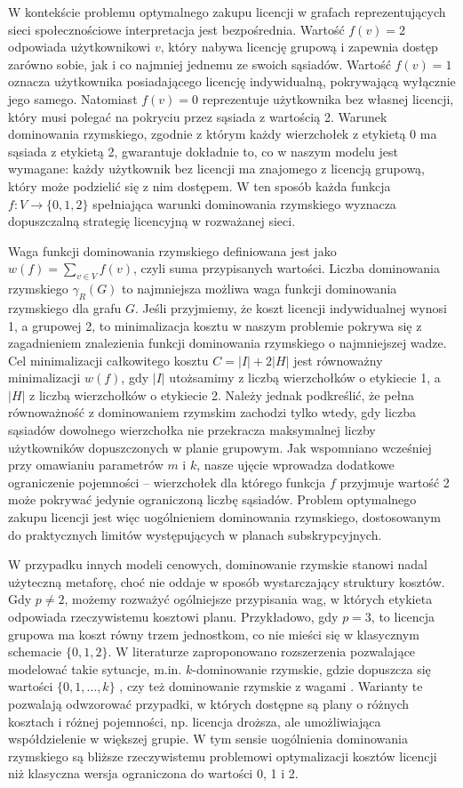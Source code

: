 W kontekście problemu optymalnego zakupu licencji w grafach reprezentujących sieci społecznościowe interpretacja jest bezpośrednia. Wartość $f(v)=2$ odpowiada użytkownikowi $v$, który nabywa licencję grupową i zapewnia dostęp zarówno sobie, jak i co najmniej jednemu ze swoich sąsiadów. Wartość $f(v)=1$ oznacza użytkownika posiadającego licencję indywidualną, pokrywającą wyłącznie jego samego. Natomiast $f(v)=0$ reprezentuje użytkownika bez własnej licencji, który musi polegać na pokryciu przez sąsiada z wartością 2. Warunek dominowania rzymskiego, zgodnie z którym każdy wierzchołek z etykietą 0 ma sąsiada z etykietą 2, gwarantuje dokładnie to, co w naszym modelu jest wymagane: każdy użytkownik bez licencji ma znajomego z licencją grupową, który może podzielić się z nim dostępem. W ten sposób każda funkcja $f:V \to \{0,1,2\}$ spełniająca warunki dominowania rzymskiego wyznacza dopuszczalną strategię licencyjną w rozważanej sieci.


Waga funkcji dominowania rzymskiego definiowana jest jako $w(f) = \sum_{v \in V} f(v)$, czyli suma przypisanych wartości. Liczba dominowania rzymskiego $\gamma_R(G)$ to najmniejsza możliwa waga funkcji dominowania rzymskiego dla grafu $G$. Jeśli przyjmiemy, że koszt licencji indywidualnej wynosi 1, a grupowej 2, to minimalizacja kosztu w naszym problemie pokrywa się z zagadnieniem znalezienia funkcji dominowania rzymskiego o najmniejszej wadze. Cel minimalizacji całkowitego kosztu $C = |I| + 2|H|$ jest równoważny minimalizacji $w(f)$, gdy $|I|$ utożsamimy z liczbą wierzchołków o etykiecie 1, a $|H|$ z liczbą wierzchołków o etykiecie 2. Należy jednak podkreślić, że pełna równoważność z dominowaniem rzymskim zachodzi tylko wtedy, gdy liczba sąsiadów dowolnego wierzchołka nie przekracza maksymalnej liczby użytkowników dopuszczonych w planie grupowym. Jak wspomniano wcześniej przy omawianiu parametrów $m$ i $k$, nasze ujęcie wprowadza dodatkowe ograniczenie pojemności -- wierzchołek dla którego funkcja $f$ przyjmuje wartość 2 może pokrywać jedynie ograniczoną liczbę sąsiadów. Problem optymalnego zakupu licencji jest więc uogólnieniem dominowania rzymskiego, dostosowanym do praktycznych limitów występujących w planach subskrypcyjnych.

W przypadku innych modeli cenowych, dominowanie rzymskie stanowi nadal użyteczną metaforę, choć nie oddaje w sposób wystarczający struktury kosztów. Gdy $p \neq 2$, możemy rozważyć ogólniejsze przypisania wag, w których etykieta odpowiada rzeczywistemu kosztowi planu. Przykładowo, gdy $p=3$, to licencja grupowa ma koszt równy trzem jednostkom, co nie mieści się w klasycznym schemacie $\{0,1,2\}$. W literaturze zaproponowano rozszerzenia pozwalające modelować takie sytuacje, m.in. $k$-dominowanie rzymskie, gdzie dopuszcza się wartości $\{0,1,\dots,k\}$ \cite{CHAUDHARY2024301}, czy też dominowanie rzymskie z wagami \cite{Ghaffari2020}. Warianty te pozwalają odwzorować przypadki, w których dostępne są plany o różnych kosztach i różnej pojemności, np. licencja droższa, ale umożliwiająca współdzielenie w większej grupie. W tym sensie uogólnienia dominowania rzymskiego są bliższe rzeczywistemu problemowi optymalizacji kosztów licencji niż klasyczna wersja ograniczona do wartości 0, 1 i 2.

